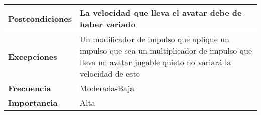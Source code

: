\begin{longtable}{l|l}
\begin{minipage}{0.25\columnwidth}
\textbf{Postcondiciones} 
\end{minipage}
&
\begin{minipage}{0.65\columnwidth}
La velocidad que lleva el avatar debe de haber variado
\end{minipage}
\\ \hline

\begin{minipage}{0.25\columnwidth}
\textbf{Excepciones} 
\end{minipage}
&
\begin{minipage}{0.65\columnwidth}
Un modificador de impulso que aplique un impulso que sea un multiplicador de impulso que lleva un avatar jugable quieto no variará la velocidad de este 
\end{minipage}
\\ \hline

\begin{minipage}{0.25\columnwidth}
\textbf{Frecuencia} 
\end{minipage}
&
\begin{minipage}{0.65\columnwidth}
Moderada-Baja
\end{minipage}
\\ \hline

\begin{minipage}{0.25\columnwidth}
\textbf{Importancia} 
\end{minipage}
&
\begin{minipage}{0.65\columnwidth}
Alta
\end{minipage}
\\ \hline
\end{longtable}


